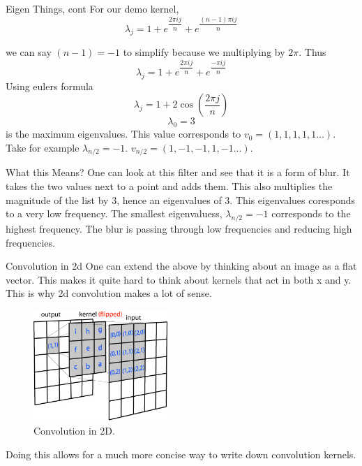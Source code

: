 \documentclass{beamer}
\begin{document}
\begin{frame}{Eigen Things, cont}
For our demo kernel,
$$\lambda_j = 1+e^{\dfrac{2\pi i j}{n}}+e^{\dfrac{(n-1)\pi i j}{n}}$$

we can say $(n-1) = -1$ to simplify because we multiplying by $2\pi$. Thus   
$$\lambda_j = 1+e^{\dfrac{2\pi i j}{n}}+e^{\dfrac{-\pi i j}{n}}$$
Using eulers formula
$$\lambda_j = 1+2\cos(\dfrac{2\pi j}{n})$$
$$\lambda_{0} = 3$$ is the maximum eigenvalues.
This value corresponds to $v_0 = (1,1,1,1,1...)$.
Take for example $\lambda_{n/2} = -1$.  $v_{n/2} = (1,-1,-1,1,-1...)$.

\end{frame}

\begin{frame}{What this Means?}
One can look at this filter and see that it is a form of blur. It takes the two values next to a point and adds them.  This also multiplies the magnitude of the list by 3, hence an eigenvalues of 3. This eigenvalues coresponds to a very low frequency. The smallest eigenvaluess, $\lambda_{n/2} = -1$ corresponds to the highest frequency. The blur is passing through low frequencies and reducing high frequencies.
\end{frame}

\begin{frame}{Convolution in 2d}
One can extend the above by thinking about an image as a flat vector. This makes it quite hard to think about kernels that act in both x and y. This is why 2d convolution makes a lot of sense.
\begin{figure}[htp]
\centering
\includegraphics[width=2in]{conv2d_matrix.jpg}
\caption{Convolution in 2D.}
\label{}
\end{figure}
Doing this allows for a much more concise way to write down convolution kernels.
\end{frame}
\end{document}
